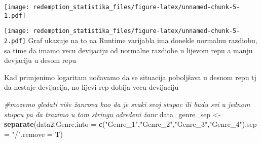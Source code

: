 \documentclass[
]{article}
\newenvironment{Shaded}{\begin{snugshade}}{\end{snugshade}}
\newcommand{\AttributeTok}[1]{\textcolor[rgb]{0.13,0.29,0.53}{#1}}
\newcommand{\CommentTok}[1]{\textcolor[rgb]{0.56,0.35,0.01}{\textit{#1}}}
\newcommand{\ConstantTok}[1]{\textcolor[rgb]{0.56,0.35,0.01}{#1}}
\newcommand{\DecValTok}[1]{\textcolor[rgb]{0.00,0.00,0.81}{#1}}
\newcommand{\FunctionTok}[1]{\textcolor[rgb]{0.13,0.29,0.53}{\textbf{#1}}}
\newcommand{\NormalTok}[1]{#1}
\newcommand{\OtherTok}[1]{\textcolor[rgb]{0.56,0.35,0.01}{#1}}
\newcommand{\SpecialCharTok}[1]{\textcolor[rgb]{0.81,0.36,0.00}{\textbf{#1}}}
\newcommand{\StringTok}[1]{\textcolor[rgb]{0.31,0.60,0.02}{#1}}
\begin{document}
\begin{Shaded}
\end{Shaded}

\texttt{[image: redemption\_statistika\_files/figure-latex/unnamed-chunk-5-1.pdf]}

\begin{Shaded}
\end{Shaded}

\texttt{[image: redemption\_statistika\_files/figure-latex/unnamed-chunk-5-2.pdf]}
Graf ukazuje na to na Runtime varijabla ima donekle normalnu razdiobu,
sa time da imamo vecu devijaciju od normalne razdiobe u lijevom repu a
manju devjaciju u desom repu

Kad primjenimo logaritam uočavamo da se situacija poboljšava u desnom
repu tj da nestaje devijacija, no lijevi rep dobija vecu devijaciju

\begin{Shaded}
\begin{Highlighting}[]
\CommentTok{\#mozemo gledati više žanrova kao da je svaki svoj stupac ili budu svi u jednom stupcu pa da trazimo u tom stringu odredeni žanr}
\NormalTok{data\_genre\_sep }\OtherTok{\textless{}{-}} \FunctionTok{separate}\NormalTok{(data2,Genre,}\AttributeTok{into =} \FunctionTok{c}\NormalTok{(}\StringTok{"Genre\_1"}\NormalTok{,}\StringTok{"Genre\_2"}\NormalTok{,}\StringTok{"Genre\_3"}\NormalTok{,}\StringTok{"Genre\_4"}\NormalTok{),}\AttributeTok{sep =} \StringTok{"/"}\NormalTok{,}\AttributeTok{remove =}\NormalTok{ T)}
\end{Highlighting}
\end{Shaded}
\end{document}
